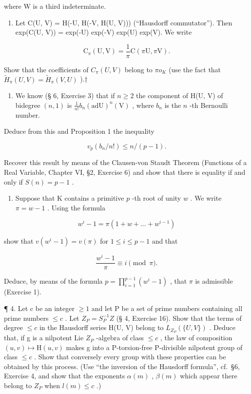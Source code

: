 where W is a third indeterminate.

\begin{enumerate}
\def\labelenumi{(\alph{enumi})}
\setcounter{enumi}{4}
\tightlist
\item
  Let C(U, V) = H(-U, H(-V, H(U, V))) (``Hausdorff commutator''). Then exp(C(U, V)) = exp(-U) exp(-V) exp(U) exp(V). We write
\end{enumerate}

\[
\mathrm{C} _ {\pi} (\mathrm{U}, \mathrm{V}) = \frac {1}{\pi} \mathrm{C} (\pi \mathrm{U}, \pi \mathrm{V}).
\]

Show that the coefficients of \(C_{\pi}(U,V)\) belong to \(\pi o_{K}\) (use the fact that \(\tilde{H}_{\pi}(U,V)=\tilde{H}_{\pi}(V,U)\) ).†

\begin{enumerate}
\def\labelenumi{\arabic{enumi}.}
\setcounter{enumi}{1}
\tightlist
\item
  We know (§ 6, Exercise 3) that if \(n \geqslant 2\) the component of H(U, V) of bidegree \((n, 1)\) is \(\frac{1}{n!} b_n(\mathrm{ad}\mathrm{U})^n (\mathrm{V})\) , where \(b_n\) is the \(n\) -th Bernoulli number.
\end{enumerate}

Deduce from this and Proposition 1 the inequality

\[
v _ {p} (b _ {n} / n!) \leqslant n / (p - 1).
\]

Recover this result by means of the Clausen-von Staudt Theorem (Functions of a Real Variable, Chapter VI, §2, Exercise 6) and show that there is equality if and only if \(S(n) = p - 1\) .

\begin{enumerate}
\def\labelenumi{\arabic{enumi}.}
\setcounter{enumi}{2}
\tightlist
\item
  Suppose that K contains a primitive \(p\) -th root of unity \(w\) . We write \(\pi = w - 1\) . Using the formula
\end{enumerate}

\[
w ^ {i} - 1 = \pi (1 + w + \dots + w ^ {i - 1})
\]

show that \(v(w^{i} - 1) = v(\pi)\) for \(1 \leqslant i \leqslant p - 1\) and that

\[
\frac {w ^ {i} - 1}{\pi} \equiv i \pmod {\pi}.
\]

Deduce, by means of the formula \(p = \prod_{i=1}^{p-1} (w^i - 1)\) , that \(\pi\) is admissible (Exercise 1).

¶ 4. Let c be an integer \(\geqslant1\) and let P be a set of prime numbers containing all prime numbers \(\leqslant c\) . Let \(Z_{P}=S_{P}^{-1}Z\) (§ 4, Exercise 16). Show that the terms of degree \(\leqslant c\) in the Hausdorff series H(U, V) belong to \(L_{Z_{P}}(\{U, V\})\) . Deduce that, if g is a nilpotent Lie \(Z_{P}\) -algebra of class \(\leqslant c\) , the law of composition \((u,v)\mapsto\mathrm{H}(u,v)\) makes g into a P-torsion-free P-divisible nilpotent group of class \(\leqslant c\) . Show that conversely every group with these properties can be obtained by this process. (Use ``the inversion of the Hausdorff formula'', cf.~§6, Exercise 4, and show that the exponents \(\alpha(m)\) , \(\beta(m)\) which appear there belong to \(Z_{P}\) when \(l(m)\leqslant c\) .)

